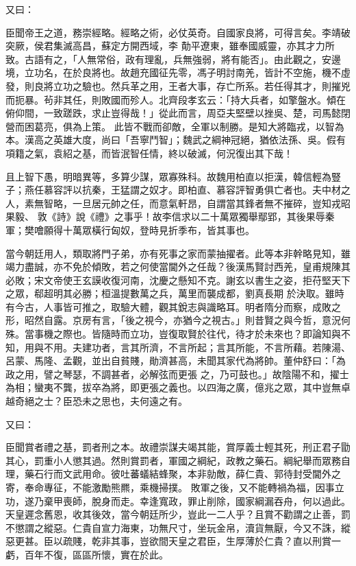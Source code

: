 \begin{pinyinscope}
 又曰：



 臣聞帝王之道，務崇經略。經略之術，必仗英奇。自國家良將，可得言矣。李靖破突厥，侯君集滅高昌，蘇定方開西域，李
 勣平遼東，雖奉國威靈，亦其才力所致。古語有之，「人無常俗，政有理亂，兵無強弱，將有能否」。由此觀之，安邊境，立功名，在於良將也。故趙充國征先零，馮子明討南羌，皆計不空施，機不虛發，則良將立功之驗也。然兵革之用，王者大事，存亡所系。若任得其才，則摧兇而扼暴。茍非其任，則敗國而殄人。北齊段孝玄云：「持大兵者，如擎盤水。傾在俯仰間，一致蹉跌，求止豈得哉！」從此而言，周亞夫堅壁以挫吳、楚，司馬懿閉營而困葛亮，俱為上策。
 此皆不戰而卻敵，全軍以制勝。是知大將臨戎，以智為本。漢高之英雄大度，尚曰「吾寧鬥智」；魏武之綱神冠絕，猶依法孫、吳。假有項籍之氣，袁紹之基，而皆泯智任情，終以破滅，何況復出其下哉！



 且上智下愚，明暗異等，多算少謀，眾寡殊科。故魏用柏直以拒漢，韓信輕為豎子；燕任慕容評以抗秦，王猛謂之奴才。即柏直、慕容評智勇俱亡者也。夫中材之人，素無智略，一旦居元帥之任，而意氣軒昂，自謂當其鋒者無不摧碎，豈知戎昭果毅、
 敦《詩》說《禮》之事乎！故李信求以二十萬眾獨舉鄢郢，其後果辱秦軍；樊噲願得十萬眾橫行匈奴，登時見折季布，皆其事也。



 當今朝廷用人，類取將門子弟，亦有死事之家而蒙抽擢者。此等本非幹略見知，雖竭力盡誠，亦不免於傾敗，若之何使當閫外之任哉？後漢馬賢討西羌，皇甫規陳其必敗；宋文帝使王玄謨收復河南，沈慶之懸知不克。謝玄以書生之姿，拒苻堅天下之眾，郗超明其必勝；桓溫提數萬之兵，萬里而襲成都，劉真長期
 於決取。雖時有今古，人事皆可推之，取驗大體，觀其銳志與識略耳。明者隋分而察，成敗之形，昭然自露。京房有言，「後之視今，亦猶今之視古。」則昔賢之與今哲，意況何殊。當事機之際也。皆隨時而立功，豈復取賢於往代，待才於未來也？即論知與不知，用與不用。夫建功者，言其所濟，不言所起；言其所能，不言所藉。若陳湯、呂蒙、馬隆、孟觀，並出自貧賤，勛濟甚高，未聞其家代為將帥。董仲舒曰：「為政之用，譬之琴瑟，不調甚者，必解弦而更張
 之，乃可鼓也。」故陰陽不和，擢士為相；蠻夷不龔，拔卒為將，即更張之義也。以四海之廣，億兆之眾，其中豈無卓越奇絕之士？臣恐未之思也，夫何遠之有。



 又曰：



 臣聞賞者禮之基，罰者刑之本。故禮崇謀夫竭其能，賞厚義士輕其死，刑正君子勖其心，罰重小人懲其過。然則賞罰者，軍國之綱紀，政教之藥石。綱紀舉而眾務自理，藥石行而文武用命。彼吐蕃蟻結蜂聚，本非勍敵，薛仁貴、郭待封受閫外之寄，奉命專征，不能激勵熊羆，乘機掃撲。
 敗軍之後，又不能轉禍為福，因事立功，遂乃棄甲喪師，脫身而走。幸逢寬政，罪止削除，國家綱漏吞舟，何以過此。天皇遲念舊恩，收其後效，當今朝廷所少，豈此一二人乎？且賞不勸謂之止善，罰不懲謂之縱惡。仁貴自宣力海東，功無尺寸，坐玩金帛，瀆貨無厭，今又不誅，縱惡更甚。臣以疏賤，乾非其事，豈欲間天皇之君臣，生厚薄於仁貴？直以刑賞一虧，百年不復，區區所懷，實在於此。




\end{pinyinscope}
